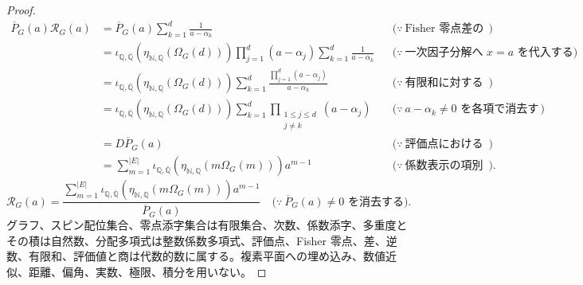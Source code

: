 \documentclass[11pt,a4paper]{article}
\theoremstyle{remark}
\begin{document}
\begin{proof}
\[\begin{aligned}
\overline P_G(a)\mathcal R_G(a)
&=
\overline P_G(a)
\sum_{k=1}^{d}\frac{1}{a-\alpha_k}
&&\bigl(\because\ \text{Fisher 零点差の逆数和の定義}\bigr)\\
&=
\iota_{\mathbb Q,\overline{\mathbb Q}}\!\left(
  \eta_{\mathbb N,\mathbb Q}(\Omega_G(d))
\right)
\prod_{j=1}^{d}(a-\alpha_j)
\sum_{k=1}^{d}\frac{1}{a-\alpha_k}
&&\bigl(\because\ \text{一次因子分解へ }x=a\text{ を代入する}\bigr)\\
&=
\iota_{\mathbb Q,\overline{\mathbb Q}}\!\left(
  \eta_{\mathbb N,\mathbb Q}(\Omega_G(d))
\right)
\sum_{k=1}^{d}
\frac{
  \displaystyle
  \prod_{j=1}^{d}(a-\alpha_j)
}{
  a-\alpha_k
}
&&\bigl(\because\ \text{有限和に対する分配律}\bigr)\\
&=
\iota_{\mathbb Q,\overline{\mathbb Q}}\!\left(
  \eta_{\mathbb N,\mathbb Q}(\Omega_G(d))
\right)
\sum_{k=1}^{d}
\prod_{\substack{1\le j\le d\\j\ne k}}(a-\alpha_j)
&&\bigl(\because\ a-\alpha_k\ne0\text{ を各項で消去する}\bigr)\\
&=D\overline P_G(a)
&&\bigl(\because\ \text{評価点における有限積の形式微分}\bigr)\\
&=
\sum_{m=1}^{|E|}
\iota_{\mathbb Q,\overline{\mathbb Q}}\!\left(
  \eta_{\mathbb N,\mathbb Q}\!\left(m\Omega_G(m)\right)
\right)
a^{m-1}
&&\bigl(\because\ \text{係数表示の項別形式微分}\bigr).
\end{aligned}\]
\[\mathcal R_G(a)
=
\frac{
  \displaystyle
  \sum_{m=1}^{|E|}
  \iota_{\mathbb Q,\overline{\mathbb Q}}\!\left(
    \eta_{\mathbb N,\mathbb Q}\!\left(m\Omega_G(m)\right)
  \right)
  a^{m-1}
}{
  \overline P_G(a)
}
\quad\bigl(\because\ \overline P_G(a)\ne0\text{ を消去する}\bigr).\]
グラフ、スピン配位集合、零点添字集合は有限集合、次数、係数添字、多重度とその積は自然数、分配多項式は整数係数多項式、評価点、Fisher 零点、差、逆数、有限和、評価値と商は代数的数に属する。複素平面への埋め込み、数値近似、距離、偏角、実数、極限、積分を用いない。

\end{proof}
\end{document}

